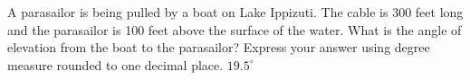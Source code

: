  {A parasailor is being pulled by a boat on Lake Ippizuti. The cable is 300 feet long and the parasailor is 100 feet above the surface of the water. What is the angle of elevation from the boat to the parasailor? Express your answer using degree measure rounded to one decimal place.}
{ $19.5^{\circ}$}
